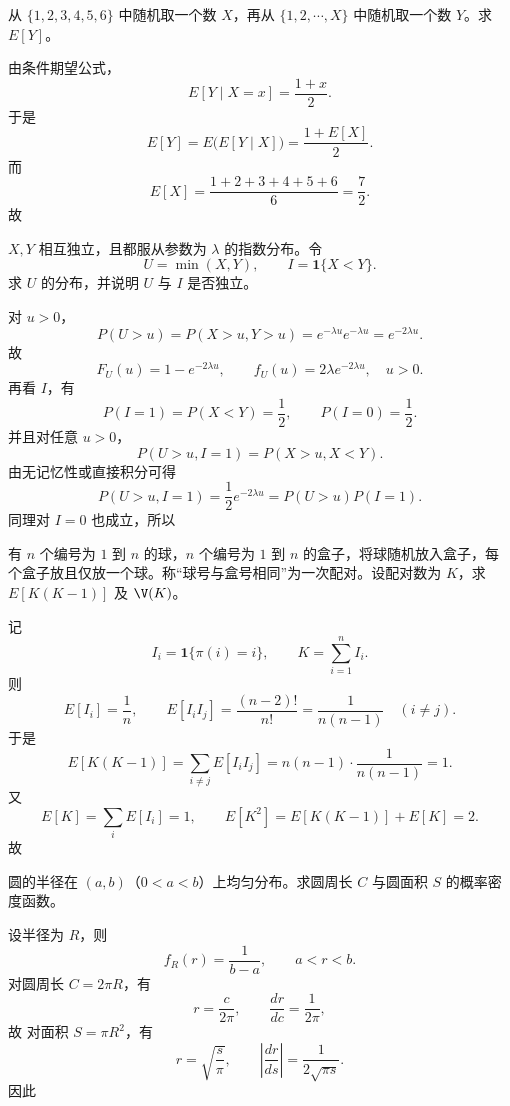 ﻿

\begin{question}
从 $\{1,2,3,4,5,6\}$ 中随机取一个数 $X$，再从 $\{1,2,\cdots,X\}$ 中随机取一个数 $Y$。求 $E[Y]$。
\begin{solution}
由条件期望公式，
\[
E[Y\mid X=x]=\frac{1+x}{2}.
\]
于是
\[
E[Y]=E\bigl(E[Y\mid X]\bigr)=\frac{1+E[X]}{2}.
\]
而
\[
E[X]=\frac{1+2+3+4+5+6}{6}=\frac72.
\]
故
\end{solution}
\end{question}

\begin{question}
$X,Y$ 相互独立，且都服从参数为 $\lambda$ 的指数分布。令
\[
U=\min(X,Y),\qquad I=\mathbf 1\{X<Y\}.
\]
求 $U$ 的分布，并说明 $U$ 与 $I$ 是否独立。
\begin{solution}
对 $u>0$，
\[
P(U>u)=P(X>u,Y>u)=e^{-\lambda u}e^{-\lambda u}=e^{-2\lambda u}.
\]
故
\[
F_U(u)=1-e^{-2\lambda u},\qquad
f_U(u)=2\lambda e^{-2\lambda u},\quad u>0.
\]
再看 $I$，有
\[
P(I=1)=P(X<Y)=\frac12,\qquad P(I=0)=\frac12.
\]
并且对任意 $u>0$，
\[
P(U>u,I=1)=P(X>u,X<Y).
\]
由无记忆性或直接积分可得
\[
P(U>u,I=1)=\frac12 e^{-2\lambda u}=P(U>u)P(I=1).
\]
同理对 $I=0$ 也成立，所以
\end{solution}
\end{question}

\begin{question}
有 $n$ 个编号为 $1$ 到 $n$ 的球，$n$ 个编号为 $1$ 到 $n$ 的盒子，将球随机放入盒子，每个盒子放且仅放一个球。称“球号与盒号相同”为一次配对。设配对数为 $K$，求 $E[K(K-1)]$ 及 $\V(K)$。
\begin{solution}
记
\[
I_i=\mathbf 1\{\pi(i)=i\},
\qquad K=\sum_{i=1}^n I_i.
\]
则
\[
E[I_i]=\frac1n,\qquad E[I_iI_j]=\frac{(n-2)!}{n!}=\frac{1}{n(n-1)}\quad(i\ne j).
\]
于是
\[
E[K(K-1)]=\sum_{i\ne j}E[I_iI_j]
=n(n-1)\cdot \frac{1}{n(n-1)}=1.
\]
又
\[
E[K]=\sum_i E[I_i]=1,
\qquad
E[K^2]=E[K(K-1)]+E[K]=2.
\]
故
\end{solution}
\end{question}

\begin{question}
圆的半径在 $(a,b)$（$0<a<b$）上均匀分布。求圆周长 $C$ 与圆面积 $S$ 的概率密度函数。
\begin{solution}
设半径为 $R$，则
\[
f_R(r)=\frac{1}{b-a},\qquad a<r<b.
\]
对圆周长 $C=2\pi R$，有
\[
r=\frac{c}{2\pi},\qquad \frac{dr}{dc}=\frac{1}{2\pi},
\]
故
对面积 $S=\pi R^2$，有
\[
r=\sqrt{\frac{s}{\pi}},\qquad
\left|\frac{dr}{ds}\right|=\frac{1}{2\sqrt{\pi s}}.
\]
因此
\end{solution}
\end{question}

